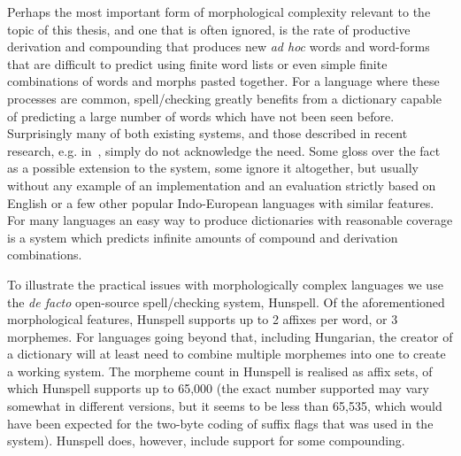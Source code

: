 \documentclass[officiallayout,final]{unihelcompling}
\begin{document}
Perhaps the most important form of morphological complexity relevant to the
topic of this thesis, and one that is often ignored, is the rate of productive
derivation and compounding that produces new \emph{ad hoc} words and word-forms
that are difficult to predict using finite word lists or even simple finite
combinations of words and morphs pasted together.  For a language where these
processes are common, spell\-/checking greatly benefits from a dictionary
capable of predicting a large number of words which have not been seen before.
Surprisingly many of both existing systems, and those described in recent
research, e.g.  in~\cite{hassan2008language,watson2003new}, simply do not
acknowledge the need.  Some gloss over the fact as a possible extension to the
system, some ignore it altogether, but usually without any example of an
implementation and an evaluation strictly based on English or a few other
popular Indo-European languages with similar features. For many languages an
easy way to produce dictionaries with reasonable coverage is a system which
predicts infinite amounts of compound and derivation combinations.

To illustrate the practical issues with morphologically complex languages we
use the \emph{de facto} open-source spell\-/checking system, Hunspell. Of the
aforementioned morphological features, Hunspell supports up to 2 affixes per
word, or 3 morphemes. For languages going beyond that, including Hungarian, the
creator of a dictionary will at least need to combine multiple morphemes into
one to create a working system. The morpheme count in Hunspell is realised as
affix sets, of which Hunspell supports up to 65,000 (the exact number supported
may vary somewhat in different versions, but it seems to be less than 65,535,
which would have been expected for the two-byte coding of suffix flags that was
used in the system). Hunspell does, however, include support for some
compounding.
\end{document}
